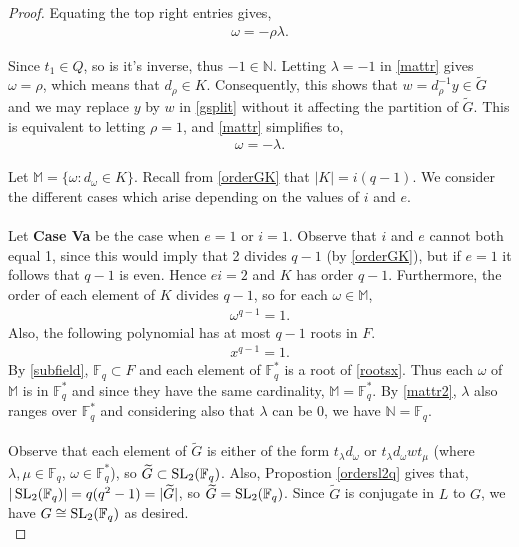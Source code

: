 \begin{proof}
Equating the top right entries gives,
\begin{align}\label{mattr} \omega = -\rho \lambda.
\end{align}

Since $t_1 \in Q$, so is it's inverse, thus $-1 \in \mathbb{N}$. Letting $\lambda = -1$ in \eqref{mattr} gives $\omega = \rho$, which means that $d_\rho \in K$. Consequently, this shows that $w = d_\rho^{-1} y \in {\widetilde{G}}$ and we may replace $y$ by $w$ in \eqref{gsplit} without it affecting the partition of ${\widetilde{G}}$. This is equivalent to letting $\rho = 1$, and \eqref{mattr} simplifies to,
\begin{align}\label{mattr2} \omega = -\lambda.
\end{align}

Let $\mathbb{M} = \{ \omega : d_\omega \in K \}$. Recall from \eqref{orderGK} that $|K| = i(q-1)$. We consider the different cases which arise depending on the values of $i$ and $e$. \\
\\
Let \textbf{Case Va} be the case when $e=1$ or $i = 1$. Observe that $i$ and $e$ cannot both equal 1, since this would imply that 2 divides $q-1$ (by \eqref{orderGK}), but if $e=1$ it follows that $q-1$ is even. Hence $ei = 2$ and $K$ has order $q-1$. Furthermore, the order of each element of $K$ divides $q-1$, so for each $\omega \in \mathbb{M}$,
\begin{align}\label{roots} \omega^{q-1} = 1.
\end{align}
Also, the following polynomial has at most $q-1$ roots in $F$.
\begin{align}\label{rootsx} x^{q-1} = 1.
\end{align}
By \eqref{subfield}, $\mathbb{F}_q \subset F$ and each element of $\mathbb{F}^*_q$ is a root of \eqref{rootsx}. Thus each $\omega$ of $\mathbb{M}$ is in $\mathbb{F}^*_q$ and since they have the same cardinality, $\mathbb{M} = \mathbb{F}^*_q$. By \eqref{mattr2}, $\lambda$ also ranges over $\mathbb{F}^*_q$ and considering also that $\lambda$ can be 0, we have $\mathbb{N} =\mathbb{F}_q$. \\
\\
Observe that each element of ${\widetilde{G}}$ is either of the form $t_\lambda d_\omega$ or $t_\lambda d_\omega w t_\mu$ (where $\lambda, \mu \in \mathbb{F}_q$, $\omega \in \mathbb{F}^*_q$), so ${\widetilde{G}} \subset \operatorname{SL}_2(\mathbb{F}_q)$. Also, Propostion \ref{ordersl2q} gives that, $|\operatorname{SL}_2(\mathbb{F}_q)| = q(q^2-1) = |{\widetilde{G}}|$, so ${\widetilde{G}} = \operatorname{SL}_2(\mathbb{F}_q)$. Since ${\widetilde{G}}$ is conjugate in $L$ to $G$, we have $G \cong \operatorname{SL}_2(\mathbb{F}_q)$  as desired. \\

\end{proof}
